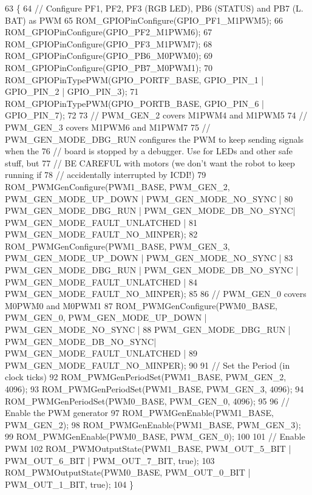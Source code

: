 \begin{DoxyCode}
63                  \{
64     \textcolor{comment}{// Configure PF1, PF2, PF3 (RGB LED), PB6 (STATUS) and PB7 (L. BAT) as PWM}
65     ROM\_GPIOPinConfigure(GPIO\_PF1\_M1PWM5);
66     ROM\_GPIOPinConfigure(GPIO\_PF2\_M1PWM6);
67     ROM\_GPIOPinConfigure(GPIO\_PF3\_M1PWM7);
68     ROM\_GPIOPinConfigure(GPIO\_PB6\_M0PWM0);
69     ROM\_GPIOPinConfigure(GPIO\_PB7\_M0PWM1);
70     ROM\_GPIOPinTypePWM(GPIO\_PORTF\_BASE, GPIO\_PIN\_1 | GPIO\_PIN\_2 | GPIO\_PIN\_3);
71     ROM\_GPIOPinTypePWM(GPIO\_PORTB\_BASE, GPIO\_PIN\_6 | GPIO\_PIN\_7);
72     
73     \textcolor{comment}{// PWM\_GEN\_2 covers M1PWM4 and M1PWM5}
74     \textcolor{comment}{// PWM\_GEN\_3 covers M1PWM6 and M1PWM7}
75     \textcolor{comment}{// PWM\_GEN\_MODE\_DBG\_RUN configures the PWM to keep sending signals when the}
76     \textcolor{comment}{// board is stopped by a debugger. Use for LEDs and other safe stuff, but}
77     \textcolor{comment}{// BE CAREFUL with motors (we don't want the robot to keep running if}
78     \textcolor{comment}{// accidentally interrupted by ICDI!)}
79     ROM\_PWMGenConfigure(PWM1\_BASE, PWM\_GEN\_2, PWM\_GEN\_MODE\_UP\_DOWN | PWM\_GEN\_MODE\_NO\_SYNC |
80         PWM\_GEN\_MODE\_DBG\_RUN | PWM\_GEN\_MODE\_DB\_NO\_SYNC| PWM\_GEN\_MODE\_FAULT\_UNLATCHED |
81         PWM\_GEN\_MODE\_FAULT\_NO\_MINPER);
82     ROM\_PWMGenConfigure(PWM1\_BASE, PWM\_GEN\_3, PWM\_GEN\_MODE\_UP\_DOWN | PWM\_GEN\_MODE\_NO\_SYNC |
83         PWM\_GEN\_MODE\_DBG\_RUN | PWM\_GEN\_MODE\_DB\_NO\_SYNC | PWM\_GEN\_MODE\_FAULT\_UNLATCHED |
84         PWM\_GEN\_MODE\_FAULT\_NO\_MINPER);
85     
86     \textcolor{comment}{// PWM\_GEN\_0 covers M0PWM0 and M0PWM1}
87     ROM\_PWMGenConfigure(PWM0\_BASE, PWM\_GEN\_0, PWM\_GEN\_MODE\_UP\_DOWN | PWM\_GEN\_MODE\_NO\_SYNC |
88         PWM\_GEN\_MODE\_DBG\_RUN | PWM\_GEN\_MODE\_DB\_NO\_SYNC| PWM\_GEN\_MODE\_FAULT\_UNLATCHED |
89         PWM\_GEN\_MODE\_FAULT\_NO\_MINPER);
90     
91     \textcolor{comment}{// Set the Period (in clock ticks)}
92     ROM\_PWMGenPeriodSet(PWM1\_BASE, PWM\_GEN\_2, 4096);
93     ROM\_PWMGenPeriodSet(PWM1\_BASE, PWM\_GEN\_3, 4096);
94     ROM\_PWMGenPeriodSet(PWM0\_BASE, PWM\_GEN\_0, 4096);
95     
96     \textcolor{comment}{// Enable the PWM generator}
97     ROM\_PWMGenEnable(PWM1\_BASE, PWM\_GEN\_2);
98     ROM\_PWMGenEnable(PWM1\_BASE, PWM\_GEN\_3);
99     ROM\_PWMGenEnable(PWM0\_BASE, PWM\_GEN\_0);
100     
101     \textcolor{comment}{// Enable PWM}
102     ROM\_PWMOutputState(PWM1\_BASE, PWM\_OUT\_5\_BIT | PWM\_OUT\_6\_BIT | PWM\_OUT\_7\_BIT, \textcolor{keyword}{true});
103     ROM\_PWMOutputState(PWM0\_BASE, PWM\_OUT\_0\_BIT | PWM\_OUT\_1\_BIT, \textcolor{keyword}{true});
104 \}
\end{DoxyCode}
\hypertarget{group__leds_ga91c5211949568d8ae8ea90fc3d4ae3b7}{}
